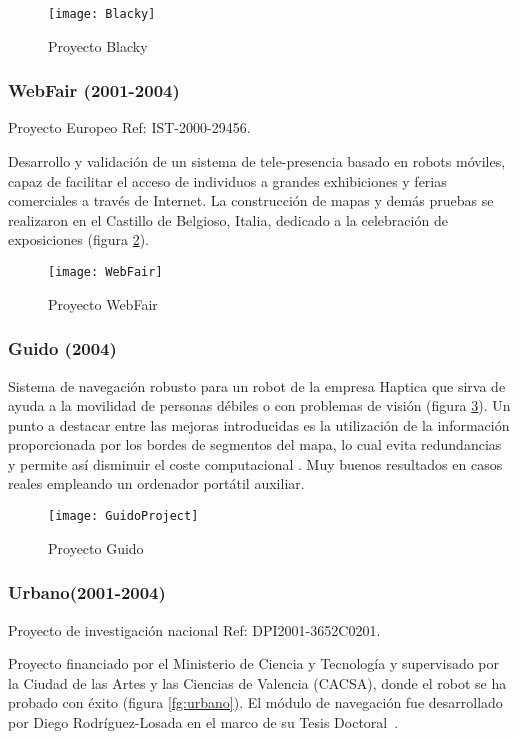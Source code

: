 \begin{figure}[hbt]
  \centering\texttt{[image: Blacky]}\\
  \caption{Proyecto Blacky}\label{fg:blacky}
\end{figure}


\subsubsection{WebFair (2001-2004)}
Proyecto Europeo Ref: IST-2000-29456.

Desarrollo y validación de un sistema de tele-presencia basado en robots móviles, capaz de facilitar el acceso de individuos a grandes exhibiciones y ferias comerciales a través de Internet. La construcción de mapas y demás pruebas se realizaron en el Castillo de Belgioso, Italia, dedicado a la celebración de exposiciones (figura \ref{fg:WebFair}).

\begin{figure}[bt]
  \centering\texttt{[image: WebFair]}\\
  \caption{Proyecto WebFair}\label{fg:WebFair}
\end{figure}

\subsubsection{Guido (2004)}
Sistema de navegación robusto para un robot de la empresa Haptica que sirva de ayuda a la movilidad de personas débiles o con problemas de visión (figura \ref{fg:guido}). Un punto a destacar entre las mejoras introducidas es la utilización de la información proporcionada por los bordes de segmentos del mapa, lo cual evita redundancias y permite así disminuir el coste computacional \cite{RodriguezLosada05}. Muy buenos resultados en casos reales empleando un ordenador portátil auxiliar.

\begin{figure}[hbt]
  \centering\texttt{[image: GuidoProject]}\\
  \caption{Proyecto Guido}\label{fg:guido}
\end{figure}

\subsubsection{Urbano(2001-2004)}\label{UrbanoProject}
Proyecto de investigación nacional Ref: DPI2001-3652C0201.

Proyecto financiado por el Ministerio de Ciencia y Tecnología y supervisado por la Ciudad de las Artes y las Ciencias de Valencia (CACSA), donde el robot se ha probado con éxito (figura \ref{fg:urbano}). El módulo de navegación fue desarrollado por Diego Rodríguez-Losada en el marco de su Tesis Doctoral~\cite{Rodriguez-Losada04}.

